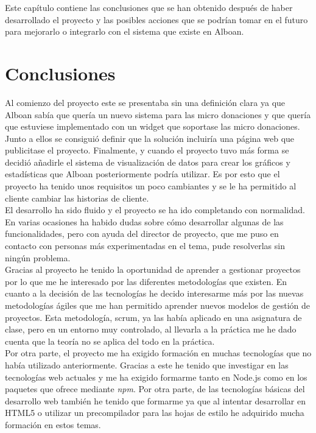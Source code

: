 Este capítulo contiene las conclusiones que se han obtenido después de haber desarrollado el proyecto y las posibles acciones que se podrían tomar en el futuro para mejorarlo o integrarlo con el sistema que existe en Alboan.

\section{Conclusiones}
Al comienzo del proyecto este se presentaba sin una definición clara ya que Alboan sabía que quería un nuevo sistema para las micro donaciones y que quería que estuviese implementado con un widget que soportase las micro donaciones. Junto a ellos se consiguió definir que la solución incluiría una página web que publicitase el proyecto. Finalmente, y cuando el proyecto tuvo más forma se decidió añadirle el sistema de visualización de datos para crear los gráficos y estadísticas que Alboan posteriormente podría utilizar. Es por esto que el proyecto ha tenido unos requisitos un poco cambiantes y se le ha permitido al cliente cambiar las historias de cliente.\\

El desarrollo ha sido fluido y el proyecto se ha ido completando con normalidad. En varias ocasiones ha habido dudas sobre cómo desarrollar algunas de las funcionalidades, pero con ayuda del director de proyecto, que me puso en contacto con personas más experimentadas en el tema, pude resolverlas sin ningún problema.\\

Gracias al proyecto he tenido la oportunidad de aprender a gestionar proyectos por lo que me he interesado por las diferentes metodologías que existen. En cuanto a la decisión de las tecnologías he decido interesarme más por las nuevas metodologías ágiles que me han permitido aprender nuevos modelos de gestión de proyectos. Esta metodología, scrum, ya las había aplicado en una asignatura de clase, pero en un entorno muy controlado, al llevarla a la práctica me he dado cuenta que la teoría no se aplica del todo en la práctica.\\

Por otra parte, el proyecto me ha exigido formación en muchas tecnologías que no había utilizado anteriormente. Gracias a este he tenido que investigar en las tecnologías web actuales y me ha exigido formarme tanto en Node.js como en los paquetes que ofrece mediante \textit{npm}. Por otra parte, de las tecnologías básicas del desarrollo web también he tenido que formarme ya que al intentar desarrollar en HTML5 o utilizar un precompilador para las hojas de estilo he adquirido mucha formación en estos temas.\\

